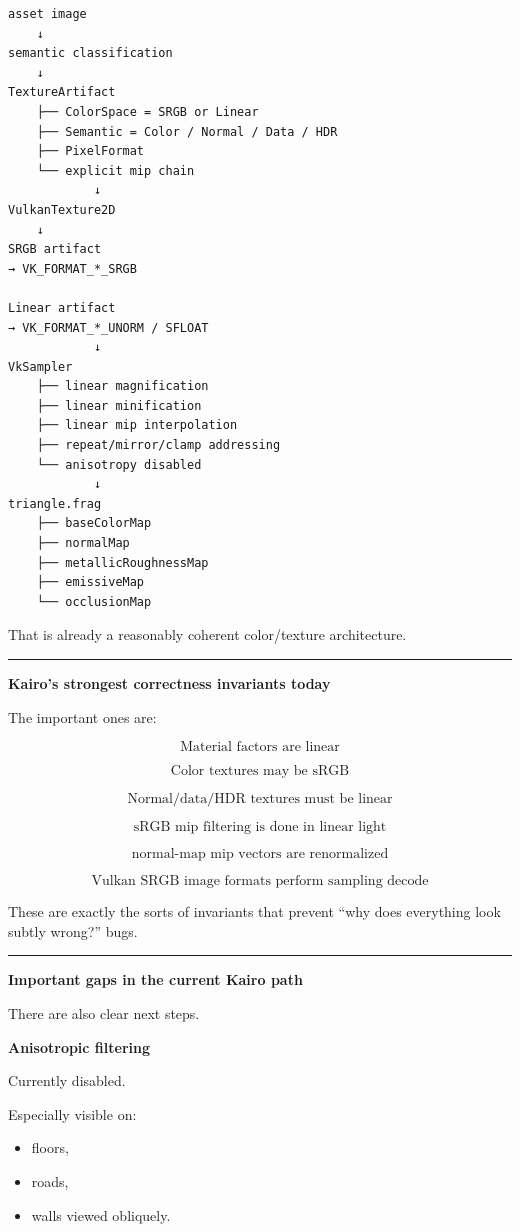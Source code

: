 \begin{verbatim}
asset image
    ↓
semantic classification
    ↓
TextureArtifact
    ├── ColorSpace = SRGB or Linear
    ├── Semantic = Color / Normal / Data / HDR
    ├── PixelFormat
    └── explicit mip chain
            ↓
VulkanTexture2D
    ↓
SRGB artifact
→ VK_FORMAT_*_SRGB

Linear artifact
→ VK_FORMAT_*_UNORM / SFLOAT
            ↓
VkSampler
    ├── linear magnification
    ├── linear minification
    ├── linear mip interpolation
    ├── repeat/mirror/clamp addressing
    └── anisotropy disabled
            ↓
triangle.frag
    ├── baseColorMap
    ├── normalMap
    ├── metallicRoughnessMap
    ├── emissiveMap
    └── occlusionMap
\end{verbatim}

That is already a reasonably coherent color/texture architecture.

\begin{center}\rule{0.5\linewidth}{0.5pt}\end{center}

\textbf{Kairo's strongest correctness invariants today}

The important ones are:

\[
\boxed{
\text{Material factors are linear}
}
\]

\[
\boxed{
\text{Color textures may be sRGB}
}
\]

\[
\boxed{
\text{Normal/data/HDR textures must be linear}
}
\]

\[
\boxed{
\text{sRGB mip filtering is done in linear light}
}
\]

\[
\boxed{
\text{normal-map mip vectors are renormalized}
}
\]

\[
\boxed{
\text{Vulkan SRGB image formats perform sampling decode}
}
\]

These are exactly the sorts of invariants that prevent ``why does everything look subtly wrong?'' bugs.

\begin{center}\rule{0.5\linewidth}{0.5pt}\end{center}

\textbf{Important gaps in the current Kairo path}

There are also clear next steps.

\textbf{Anisotropic filtering}

Currently disabled.

Especially visible on:

\begin{itemize}
\tightlist
\item
  floors,
\item
  roads,
\item
  walls viewed obliquely.
\end{itemize}

